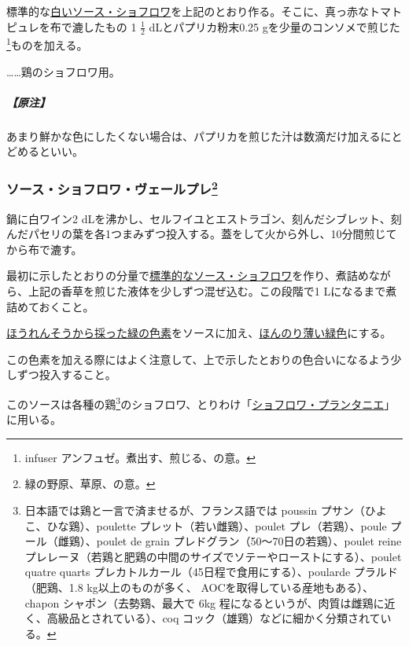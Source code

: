 \begin{recette}
標準的な\protect\hyperlink{sauce-chaud-froid-blanche-ordinaire}{白いソース・ショフロワ}を上記のとおり作る。そこに、真っ赤なトマトピュレを布で漉したもの
1 \(\frac{1}{2}\) dLとパプリカ粉末0.25
gを少量のコンソメで煎じた\footnote{infuser
  アンフュゼ。煮出す、煎じる、の意。}ものを加える。

\ldots{}\ldots{}鶏のショフロワ用。

\hypertarget{nota-sauce-chaud-froid-aurore}{%
\subparagraph{【原注】}\label{nota-sauce-chaud-froid-aurore}}

あまり鮮かな色にしたくない場合は、パプリカを煎じた汁は数滴だけ加えるにとどめるといい。

\atoaki{}

\hypertarget{sauce-choud-froid-vert-pre}{%
\subsubsection[ソース・ショフロワ・ヴェールプレ]{\texorpdfstring{ソース・ショフロワ・ヴェールプレ\footnote{緑の野原、草原、の意。}}{ソース・ショフロワ・ヴェールプレ}}\label{sauce-choud-froid-vert-pre}}



鍋に白ワイン2
dLを沸かし、セルフイユとエストラゴン、刻んだシブレット、刻んだパセリの葉を各1つまみずつ投入する。蓋をして火から外し、10分間煎じてから布で漉す。

最初に示したとおりの分量で\protect\hyperlink{sauce-chaud-froid-blanche-ordinaire}{標準的なソース・ショフロワ}を作り、煮詰めながら、上記の香草を煎じた液体を少しずつ混ぜ込む。この段階で1
Lになるまで煮詰めておくこと。

\protect\hyperlink{}{ほうれんそうから採った緑の色素}をソースに加え、\ul{ほんのり薄い緑色}にする。

この色素を加える際にはよく注意して、上で示したとおりの色合いになるよう少しずつ投入すること。

このソースは各種の鶏\footnote{日本語では鶏と一言で済ませるが、フランス語では
  poussin プサン（ひよこ、ひな鶏）、poulette
  プレット（若い雌鶏）、poulet プレ（若鶏）、poule
  プール（雌鶏）、poulet de grain プレドグラン（50〜70日の若鶏）、poulet
  reine
  プレレーヌ（若鶏と肥鶏の中間のサイズでソテーやローストにする）、poulet
  quatre quarts プレカトルカール（45日程で食用にする）、poularde
  プラルド（肥鶏、1.8 kg以上のものが多く、
  AOCを取得している産地もある）、chapon シャポン（去勢鶏、最大で 6kg
  程になるというが、肉質は雌鶏に近く、高級品とされている）、coq
  コック（雄鶏）などに細かく分類されている。}のショフロワ、とりわけ「\protect\hyperlink{}{ショフロワ・プランタニエ}」に用いる。


\end{recette}
